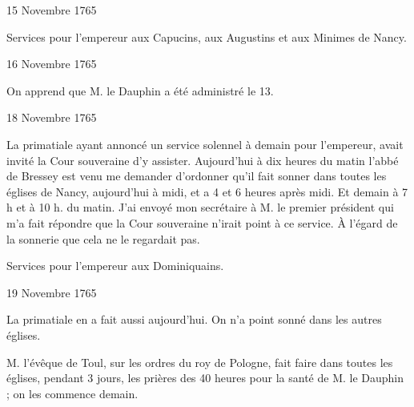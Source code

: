                      \begin{diary}{15 Novembre 1765}{}

                         Services pour l'empereur aux Capucins, aux
                              Augustins et aux Minimes de Nancy. \bigskip


                     \end{diary}

                     \begin{diary}{16 Novembre 1765}{}

                         On apprend que M. le Dauphin a
                           été
                           administré
                           le 13. \bigskip


                     \end{diary}

                     \begin{diary}{18 Novembre 1765}{}


                           La primatiale
                           ayant annoncé un service solennel
                           à demain pour l'empereur, avait invité la
                              Cour souveraine d'y assister. Aujourd'hui à dix
                           heures du matin l'abbé de
                              Bressey est venu
                           me demander d'ordonner qu'il fait sonner
                           dans toutes les églises de Nancy, aujourd'hui
                           à midi, et a 4 et 6 heures après midi. Et
                              demain à 7 h et à 10 h. du matin. J'ai
                           envoyé mon
                              secrétaire à M. le premier président
                           qui m'a fait répondre que la Cour souveraine n'irait
                           point à ce service. À l'égard de la sonnerie
                           que cela ne le regardait pas.
                        \bigskip


                         Services pour l'empereur aux Dominiquains. \bigskip


                     \end{diary}

                     \begin{diary}{19 Novembre 1765}{}


                           La primatiale en a fait
                           aussi aujourd'hui.
                           On n'a point sonné dans les autres églises. \bigskip



                           M. l'évêque de Toul, sur les ordres
                           du roy
                              de Pologne, fait faire dans toutes les églises,
                           pendant 3 jours, les prières des 40 heures
                           pour la santé de M. le
                              Dauphin ; on les
                           commence demain. \bigskip


                     \end{diary}

